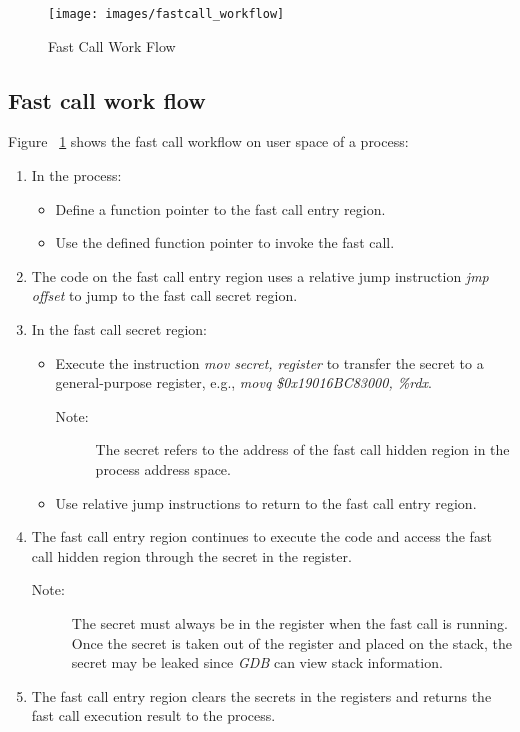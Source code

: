 \begin{figure}[tbp]
  \centering
  \texttt{[image: images/fastcall\_workflow]}
  \caption[Fast Call Work Flow]{Fast Call Work Flow}
  \label{fig:fastcall_workflow}
\end{figure}
\subsection{Fast call work flow}
Figure ~\ref{fig:fastcall_workflow} shows the fast call workflow on user space of a process:
\begin{enumerate}
  \item In the process:
    \begin{itemize}
      \item Define a function pointer to the fast call entry region.
      \item Use the defined function pointer to invoke the fast call.
    \end{itemize}
  \item The code on the fast call entry region uses a relative jump instruction \emph{jmp offset} to jump to the fast call secret region.
  \item In the fast call secret region:  
    \begin{itemize}
      \item Execute the instruction \emph{mov secret, register} to transfer the secret to a general-purpose register,  e.g., \emph{movq \$0x19016BC83000, \%rdx}.
        \begin{description}
          \item[Note:] The secret refers to the address of the fast call hidden region in the process address space.
        \end{description}
      \item Use relative jump instructions to return to the fast call entry region.
    \end{itemize}
  \item The fast call entry region continues to execute the code and access the fast call hidden region through the secret in the register.
  \begin{description}
    \item[Note:] The secret must always be in the register when the fast call is running. 
    Once the secret is taken out of the register and placed on the stack, 
    the secret  may be leaked since \emph{GDB} can view stack information.
  \end{description}
  \item The fast call entry region clears the secrets in the registers and returns the fast call execution result to the process.
\end{enumerate}

